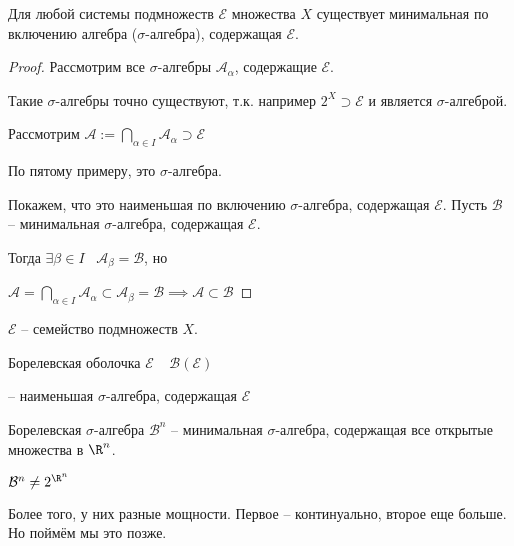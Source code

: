 \begin{theorem}\thmslashn
	
	Для любой системы подмножеств $\mathcal{E}$ множества $X$ существует минимальная по включению алгебра ($\sigma$-алгебра), содержащая $\mathcal{E}$.
\end{theorem}


\begin{proof}\thmslashn
	
	Рассмотрим все $\sigma$-алгебры $\mathcal{A}_{\alpha}$, содержащие $\mathcal{E}$.
	
	Такие $\sigma$-алгебры точно существуют, т.к. например $2^X \supset \mathcal{E}$ и является $\sigma$-алгеброй.
	
	
	Рассмотрим $\mathcal{A} := \bigcap\limits_{\alpha\in I} \mathcal{A}_{\alpha} \supset \mathcal{E}$

	По пятому примеру, это $\sigma$-алгебра.
	
	Покажем, что это наименьшая по включению $\sigma$-алгебра, содержащая $\mathcal{E}$. Пусть $\mathcal{B}$ -- минимальная $\sigma$-алгебра, содержащая $\mathcal{E}$.
	
	Тогда $\exists \beta \in I  \;\;\; \mathcal{A}_{\beta} = \mathcal{B}$, но
	
	$\mathcal{A} = \bigcap\limits_{\alpha \in I} \mathcal{A}_{\alpha} \subset \mathcal{A}_{\beta} = \mathcal{B} \implies \mathcal{A} \subset \mathcal{B}$
\end{proof}

\begin{definition}\thmslashn
	
	$\mathcal{E}$ -- семейство подмножеств $X$.
	
	Борелевская оболочка $\mathcal{E} \;\;\;\; \mathcal{B}(\mathcal{E})$
	
	-- наименьшая $\sigma$-алгебра, содержащая $\mathcal{E}$
	
	
\end{definition}

\begin{definition}\thmslashn
	
	Борелевская $\sigma$-алгебра $\mathcal{B}^n$ -- минимальная $\sigma$-алгебра, содержащая все открытые множества в $\R^n$.
\end{definition}


\begin{remark}\thmslashn
	
	$\mathcal{B}^n \ne 2^{\R^n}$
	
	Более того, у них разные мощности. Первое -- континуально, второе еще больше. Но поймём мы это позже.
\end{remark}
